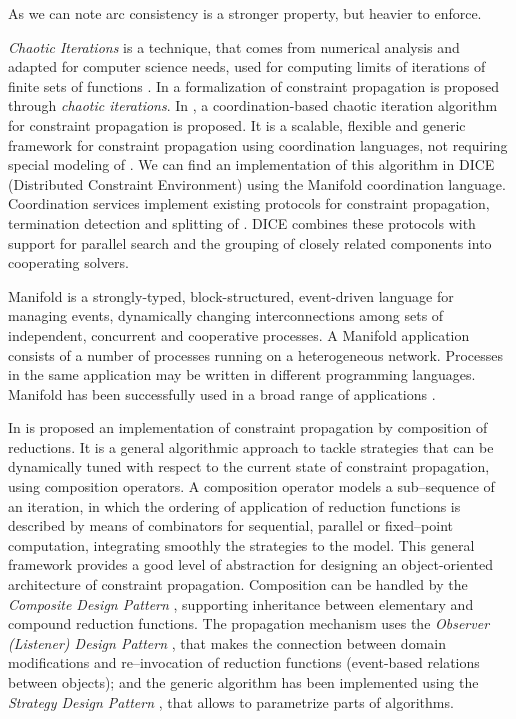 As we can note arc consistency is a stronger property, but heavier to enforce.

\textit{Chaotic Iterations} is a technique, that comes from numerical analysis and adapted for computer science needs, used for computing limits of iterations of finite sets of functions \cite{Chazan1969, Cousot1977}. In \cite{Apt,Monfroy} a formalization of constraint propagation is proposed through {\it chaotic iterations}. In \cite{Monfroy2000}, a coordination-based chaotic iteration algorithm for constraint propagation is proposed. It is a scalable, flexible and generic framework for constraint propagation using coordination languages, not requiring special modeling of \csps. We can find an implementation of this algorithm in {\sc DICE} (Distributed Constraint Environment) \cite{Zoeteweij2003} using the {\sc Manifold} coordination language. Coordination services implement existing protocols for constraint propagation, termination detection and splitting of \csps. {\sc DICE} combines these protocols with support for parallel search and the grouping of closely related components into cooperating solvers.

{\sc Manifold} is a strongly-typed, block-structured, event-driven language for managing events, dynamically changing interconnections among sets of independent, concurrent and cooperative processes. A {\sc Manifold} application consists of a number of processes running on a heterogeneous network. Processes in the same application may be written in different programming languages. {\sc Manifold} has been successfully used in a broad range of applications \cite{Arbab1995}.

In \cite{Granvilliers2001} is proposed an implementation of constraint propagation by composition of reductions. It is a general algorithmic approach to tackle strategies that can be dynamically tuned with respect to the current state of constraint propagation, using composition operators. A composition operator models a sub--sequence of an iteration, in which the ordering of application of reduction functions is described by means of combinators for sequential, parallel or fixed--point computation, integrating smoothly the strategies to the model. This general framework provides a good level of abstraction for designing an object-oriented architecture of constraint propagation. Composition can be handled by the {\it Composite Design Pattern} \cite{DP_Composite}, supporting inheritance between elementary and compound reduction functions. The propagation mechanism uses the {\it Observer (Listener) Design Pattern} \cite{DP_Observer}, that makes the connection between domain modifications and re--invocation of reduction functions (event-based relations between objects); and the generic algorithm has been implemented using the {\it Strategy Design Pattern} \cite{DP_Strategy}, that allows to parametrize parts of algorithms.

